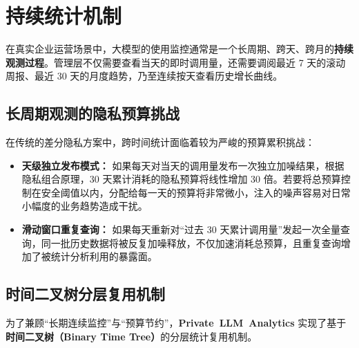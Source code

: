 \section{持续统计机制}
\label{sec:continual_observation}

在真实企业运营场景中，大模型的使用监控通常是一个长周期、跨天、跨月的\textbf{持续观测过程}。管理层不仅需要查看当天的即时调用量，还需要调阅最近 7 天的滚动周报、最近 30 天的月度趋势，乃至连续按天查看历史增长曲线。

\subsection{长周期观测的隐私预算挑战}
在传统的差分隐私方案中，跨时间统计面临着较为严峻的预算累积挑战：
\begin{itemize}[leftmargin=2em]
  \item \textbf{天级独立发布模式：} 如果每天对当天的调用量发布一次独立加噪结果，根据隐私组合原理，30 天累计消耗的隐私预算将线性增加 30 倍。若要将总预算控制在安全阈值以内，分配给每一天的预算将非常微小，注入的噪声容易对日常小幅度的业务趋势造成干扰。
  \item \textbf{滑动窗口重复查询：} 如果每天重新对“过去 30 天累计调用量”发起一次全量查询，同一批历史数据将被反复加噪释放，不仅加速消耗总预算，且重复查询增加了被统计分析利用的暴露面。
\end{itemize}

\subsection{时间二叉树分层复用机制}
为了兼顾“长期连续监控”与“预算节约”，\textbf{\mbox{Private LLM Analytics}} 实现了基于\textbf{时间二叉树（Binary Time Tree）}的分层统计复用机制。

